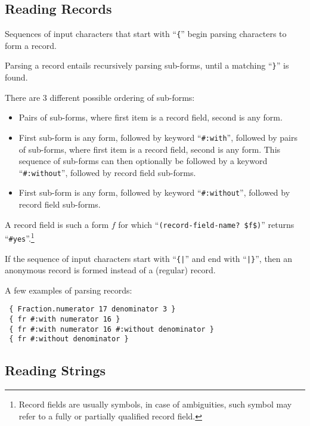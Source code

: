 \subsection{Reading Records}
\label{subsec:aml-base-lang-reader-records}

Sequences of input characters that start with ``\lstinline!{!'' begin parsing characters to form a record.

Parsing a record entails recursively parsing sub-forms, until a matching ``\lstinline!}!'' is found. 

There are 3 different possible ordering of sub-forms:
\begin{itemize}
  \item Pairs of sub-forms, where first item is a record field, second is any form.
  \item First sub-form is any form, followed by keyword ``\lstinline!#:with!'', followed by pairs of sub-forms, where first item is a record field, second is any form. This sequence of sub-forms can then optionally be followed by a keyword ``\lstinline!#:without!'', followed by record field sub-forms.
  \item First sub-form is any form, followed by keyword ``\lstinline!#:without!'', followed by record field sub-forms.
\end{itemize}

A record field is such a form $f$ for which ``\lstinline!(record-field-name? $f$)!'' returns ``\lstinline!#yes!''.\footnote{Record fields are usually symbols, in case of ambiguities, such symbol may refer to a fully or partially qualified record field.}

If the sequence of input characters start with ``\lstinline!{|!'' and end with ``\lstinline!|}!'', then an anonymous record is formed instead of a (regular) record.

\example A few examples of parsing records:

\begin{lstlisting}
 { Fraction.numerator 17 denominator 3 }
 { fr #:with numerator 16 }
 { fr #:with numerator 16 #:without denominator }
 { fr #:without denominator }
\end{lstlisting}






\subsection{Reading Strings}
\label{subsec:aml-base-lang-reader-strings}

